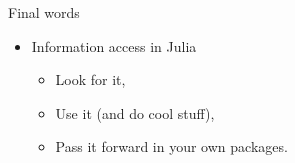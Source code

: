 \documentclass{beamer}
\begin{document}
%
%

\begin{frame}{Final words}
  \begin{itemize}
    \item Information access in Julia
    \begin{itemize}
      \setlength{\itemsep}{3mm}
      \item Look for it,
      \item Use it (and do cool stuff),
      \item Pass it forward in your own packages.
    \end{itemize}
  \end{itemize}

\end{frame}
\end{document}

